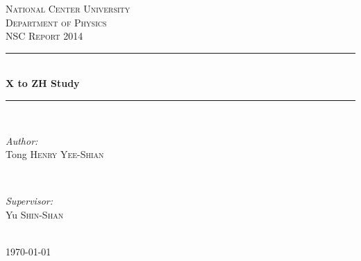 \documentclass[12pt]{article} %
\begin{document}

\begin{titlepage}

  \newcommand{\HRule}{\rule{\linewidth}{0.5mm}} %

  \center %

  \textsc{\LARGE National Center University}\\[1.5cm] %
  \textsc{\Large Department of Physics}\\[0.5cm] %
  \textsc{\large NSC Report 2014}\\[0.5cm] %

  \HRule \\[0.4cm]
         { \huge \bfseries X to ZH Study}\\[0.4cm] %
         \HRule \\[1.5cm]

         \begin{minipage}{0.4\textwidth}
           \begin{flushleft} \large
             \emph{Author:}\\
             Tong \textsc{Henry Yee-Shian} %
           \end{flushleft}
         \end{minipage}
         ~
         \begin{minipage}{0.4\textwidth}
           \begin{flushright} \large
             \emph{Supervisor:} \\
             Yu \textsc{Shin-Shan} %
           \end{flushright}
         \end{minipage}\\[4cm]

         {\large \today}\\[3cm] %


         \vfill %

\end{titlepage}
\end{document}
